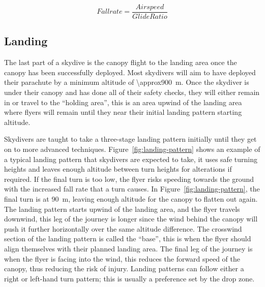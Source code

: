 \begin{equation}\label{eq:fallrate}
  Fallrate = \frac{Airspeed}{Glide Ratio}
\end{equation}

\subsection{Landing}
The last part of a skydive is the canopy flight to the landing area once the canopy has been successfully deployed. Most skydivers will aim to have deployed their parachute by a minimum altitude of \SI{\approx900}{\metre}.
Once the skydiver is under their canopy and has done all of their safety checks, they will either remain in or travel to the ``holding area'', this is an area upwind of the landing area where flyers will remain until they near their initial landing pattern starting altitude.

Skydivers are taught to take a three-stage landing pattern initially until they get on to more advanced techniques. Figure~\vref{fig:landing-pattern} shows an example of a typical landing pattern that skydivers are expected to take, it uses safe turning heights and leaves enough altitude between turn heights for alterations if required. If the final turn is too low, the flyer risks speeding towards the ground with the increased fall rate that a turn causes. In Figure~\vref{fig:landing-pattern}, the final turn is at \SI{90}{\metre}, leaving enough altitude for the canopy to flatten out again. The landing pattern starts upwind of the landing area, and the flyer travels downwind, this leg of the journey is longer since the wind behind the canopy will push it further horizontally over the same altitude difference. The crosswind section of the landing pattern is called the ``base'', this is when the flyer should align themselves with their planned landing area. The final leg of the journey is when the flyer is facing into the wind, this reduces the forward speed of the canopy, thus reducing the risk of injury. Landing patterns can follow either a right or left-hand turn pattern; this is usually a preference set by the drop zone.

